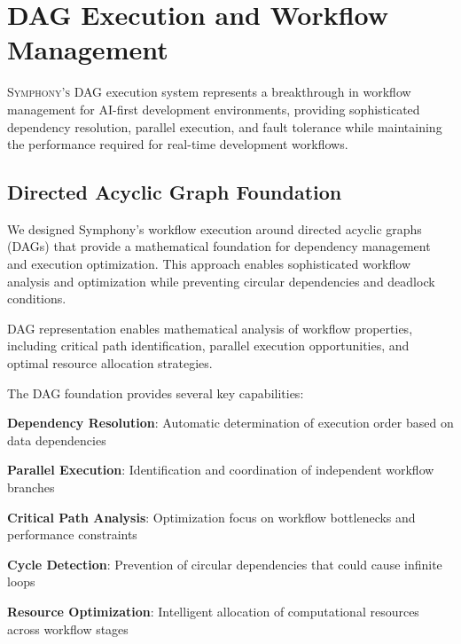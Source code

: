 
\section*{DAG Execution and Workflow Management}

\lettrine{S}{ymphony's} DAG execution system represents a breakthrough in workflow management for AI-first development environments, providing sophisticated dependency resolution, parallel execution, and fault tolerance while maintaining the performance required for real-time development workflows.

\subsection*{Directed Acyclic Graph Foundation}

We designed Symphony's workflow execution around directed acyclic graphs (DAGs) that provide a mathematical foundation for dependency management and execution optimization. This approach enables sophisticated workflow analysis and optimization while preventing circular dependencies and deadlock conditions.

\begin{infobox}[title=DAG-Based Workflow Advantages]
DAG representation enables mathematical analysis of workflow properties, including critical path identification, parallel execution opportunities, and optimal resource allocation strategies.
\end{infobox}

The DAG foundation provides several key capabilities:

\begin{compactlist}
    \item \textbf{Dependency Resolution}: Automatic determination of execution order based on data dependencies
    \item \textbf{Parallel Execution}: Identification and coordination of independent workflow branches
    \item \textbf{Critical Path Analysis}: Optimization focus on workflow bottlenecks and performance constraints
    \item \textbf{Cycle Detection}: Prevention of circular dependencies that could cause infinite loops
    \item \textbf{Resource Optimization}: Intelligent allocation of computational resources across workflow stages
\end{compactlist}

